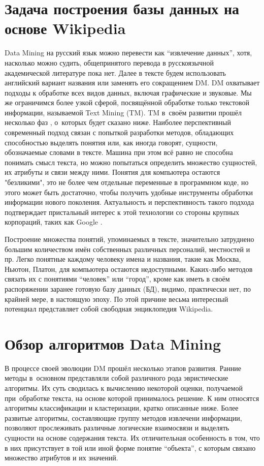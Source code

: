 \section {Задача построения базы данных на основе Wikipedia}

Data Mining на русский язык можно перевести как ``извлечение данных'',
хотя, насколько можно судить, общепринятого перевода в русскоязычной
академической литературе пока нет. Далее в тексте будем использовать
английский вариант названия или заменять его сокращением DM. 
DM охватывает подходы к обработке всех видов данных, включая графические и звуковые. 
Мы же ограничимся более узкой сферой, посвящённой
обработке только текстовой информации, называемой Text Mining (TM).
TM в~своём развитии прошёл несколько фаз \cite{fixme}, о~которых будет сказано ниже. 
Наиболее перспективный современный подход связан с попыткой разработки методов, обладающих
способностью выделять понятия или, как иногда говорят, сущности, обозначаемые словами в тексте. 
Машина при этом всё равно не способна 
понимать смысл текста, но можно попытаться определить множество
сущностей, их атрибуты и связи между ними. Понятия для компьютера
остаются "безликими", это не более чем отдельные переменные в
программном коде, но этого может быть достаточно, чтобы получить
удобные инструменты обработки информации нового
поколения. Актуальность и перспективность такого подхода подтверждает
пристальный интерес к этой технологии со стороны крупных корпораций,
таких как Google \cite{fixme}.

Построение множества понятий, упоминаемых в тексте, значительно
затруднено большим количеством имён собственных различных персоналий,
местностей и пр. Легко понятные каждому человеку имена и названия,
такие как Москва, Ньютон, Платон, для компьютера остаются
недоступными. Каких-либо методов связать их с понятиями ``человек'' или
``город'', кроме как иметь в своём распоряжении заранее готовую базу
данных (БД), видимо, практически нет, по крайней мере, в настоящую эпоху. 
По этой причине весьма интересный потенциал представляет собой
свободная энциклопедия Wikipedia.


\section{Обзор алгоритмов Data Mining}

В процессе своей эволюции DM прошёл несколько этапов развития.
 Ранние методы в~основном представляли собой различного рода эвристические алгоритмы.
Их суть сводилась к вычислению некоторой оценки, получаемой
при~обработке текста, на основе которой принималось решение. К ним
относятся алгоритмы классификации и кластеризации, кратко описанные ниже. 
Более развитые алгоритмы, составляющие группу методов извлечени информации, 
позволяют прослеживать различные логические взаимосвязи и выделять сущности на основе содержания текста. 
Их отличительная особенность в том, что в них присутствует в той или иной форме понятие
``объекта'', с которым связано множество атрибутов и их значений.

